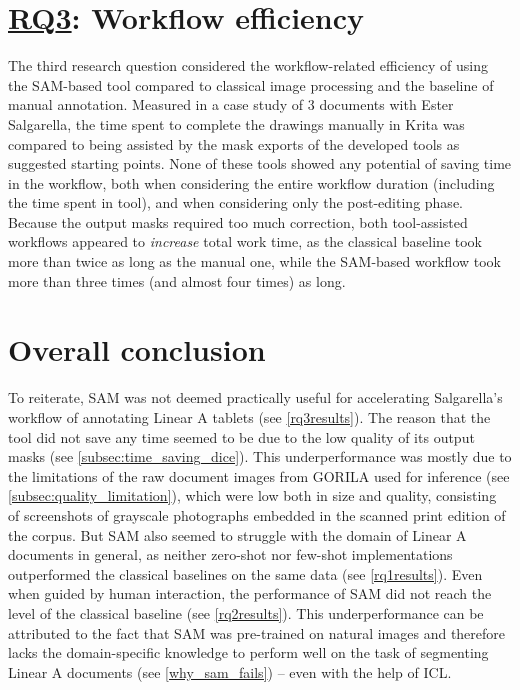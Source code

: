 \section{\hyperref[rq3]{\acs{RQ}3}: Workflow efficiency}
The third research question considered the workflow-related efficiency of using the \acs{SAM}-based tool compared to classical image processing and the baseline of manual annotation.
Measured in a case study of 3 documents with Ester Salgarella, the time spent to complete the drawings manually in Krita was compared to being assisted by the mask exports of the developed tools as suggested starting points.
None of these tools showed any potential of saving time in the workflow, both when considering the entire workflow duration (including the time spent in tool), and when considering only the post-editing phase.
Because the output masks required too much correction, both tool-assisted workflows appeared to \textit{increase} total work time, as the classical baseline took more than twice as long as the manual one, while the \acs{SAM}-based workflow took more than three times (and almost four times) as long.

\section{Overall conclusion}
To reiterate, \acs{SAM} was not deemed practically useful for accelerating Salgarella's workflow of annotating Linear A tablets (see \cref{rq3results}).
The reason that the tool did not save any time seemed to be due to the low quality of its output masks (see \cref{subsec:time_saving_dice}).
This underperformance was mostly due to the limitations of the raw document images from \acs{GORILA} used for inference (see \cref{subsec:quality_limitation}), which were low both in size and quality, consisting of screenshots of grayscale photographs embedded in the scanned print edition of the corpus.
But \acs{SAM} also seemed to struggle with the domain of Linear A documents in general, as neither zero-shot nor few-shot implementations outperformed the classical baselines on the same data (see \cref{rq1results}).
Even when guided by human interaction, the performance of \acs{SAM} did not reach the level of the classical baseline (see \cref{rq2results}).
This underperformance can be attributed to the fact that \acs{SAM} was pre-trained on natural images and therefore lacks the domain-specific knowledge to perform well on the task of segmenting Linear A documents (see \cref{why_sam_fails}) -- even with the help of \acs{ICL}.

